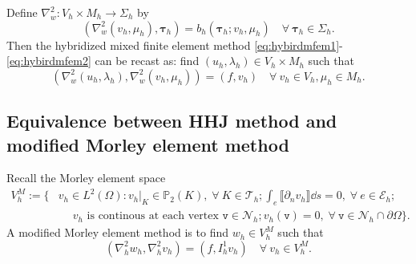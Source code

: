 Define $\nabla_w^2: V_h\times M_h\to\Sigma_h$ by 
$$
(\nabla_w^2(v_h,\mu_h), \boldsymbol\tau_h)=b_h(\boldsymbol\tau_h; v_h,\mu_h)\quad\forall~\boldsymbol\tau_h\in\Sigma_h.
$$
Then the hybridized mixed finite element method \eqref{eq:hybirdmfem1}-\eqref{eq:hybirdmfem2} can be recast as: find $(u_h,\lambda_h)\in V_h\times M_h$ such that
$$
(\nabla_w^2(u_h,\lambda_h), \nabla_w^2(v_h,\mu_h))=(f, v_h)\quad\forall~v_h\in V_h, 
\mu_h\in M_h.
$$


\subsection{Equivalence between HHJ method and modified Morley element method}
Recall the Morley element space
\begin{align*}
V_h^M := \Big\{&v_h\in L^2(\Omega): v_h|_K\in \mathbb P_2(K),\; \forall~K \in
\mathcal{T}_h; \displaystyle\int_e\llbracket\partial_{n} v_h\rrbracket\dd s = 0,\; \forall~e \in
\mathcal{E}_h; \\
&
\quad\; v_h \textrm{ is continous at each vertex } \texttt{v}\in \mathcal N_h; v_h(\texttt{v})=0, \;\forall~ \texttt{v}\in\mathcal N_h \cap \partial\Omega
 \Big\}.
\end{align*}
A modified Morley element method is to find
$w_h\in V_h^M$ such that
\begin{equation}\label{eq:modiMorley4Biharmonic}
(\nabla_h^2 w_h, \nabla_h^2 v_h)=(f, I_h^1v_h)\quad\forall~v_h\in V_h^M.
\end{equation}


